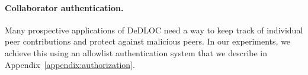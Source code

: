 


\vspace{-4pt}
\paragraph{Collaborator authentication.} Many prospective applications of DeDLOC need a way to keep track of individual peer contributions and protect against malicious peers. In our experiments, we achieve this using an allowlist authentication system that we describe in Appendix~\ref{appendix:authorization}.



